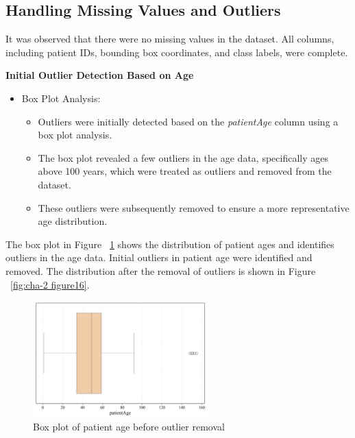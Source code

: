 \subsection{Handling Missing Values and Outliers}
\label{subsec:chap2 section 1.5}

It was observed that there were no missing values in the dataset. All columns, including patient IDs, bounding box coordinates, and class labels, were complete.

\textbf{Initial Outlier Detection Based on Age}
\begin{itemize}
    \item Box Plot Analysis:
          \begin{itemize}
              \item Outliers were initially detected based on the \emph{patientAge} column using a box plot analysis.
              \item The box plot revealed a few outliers in the age data, specifically ages above 100 years, which were treated as outliers and removed from the dataset.
              \item These outliers were subsequently removed to ensure a more representative age distribution.
          \end{itemize}
\end{itemize}

The box plot in Figure ~\ref{fig:cha-2 figure15} shows the distribution of patient ages and identifies outliers in the age data. Initial outliers in patient age were identified and removed. The distribution after the removal of outliers is shown in Figure ~\ref{fig:cha-2 figure16}.

\begin{figure}[H]
    \begin{center}
        \includegraphics[width = 0.6\textwidth]{figures/Figure2.png}
        \caption{Box plot of patient age before outlier removal}
        \label{fig:cha-2 figure15}
    \end{center}
\end{figure}

